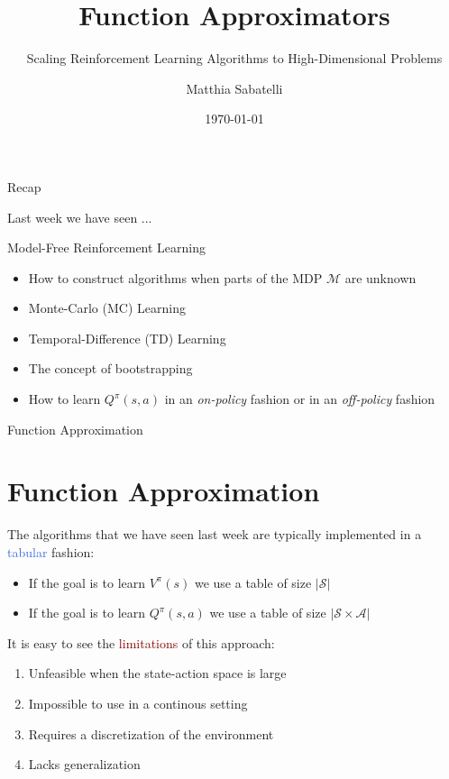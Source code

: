 \documentclass{beamer}
\title{Function Approximators}
\subtitle{Scaling Reinforcement Learning Algorithms to High-Dimensional Problems}
\author{Matthia Sabatelli}
\date{\today}
\begin{document}
\frame{\titlepage} 

\begin{frame}{Recap}

	Last week we have seen ...
	\begin{block}{Model-Free Reinforcement Learning}
		\begin{itemize}
			\item How to construct algorithms when parts of the MDP $\mathcal{M}$ are unknown
			\item Monte-Carlo (MC) Learning
			\item Temporal-Difference (TD) Learning
			\item The concept of bootstrapping
			\item How to learn $Q^{\pi}(s,a)$ in an \textit{on-policy} fashion or in an \textit{off-policy} fashion
		\end{itemize}
	\end{block}

\end{frame}




\begin{frame}{Function Approximation}
	\section{Function Approximation}

	The algorithms that we have seen last week are typically implemented in a \textcolor{RoyalBlue}{tabular} fashion:
	\begin{itemize}
		\item If the goal is to learn $V^{\pi}(s)$ we use a table of size $|\mathcal{S}|$
		\item If the goal is to learn $Q^{\pi}(s,a)$ we use a table of size $|\mathcal{S}\times\mathcal{A}|$
	\end{itemize}

	It is easy to see the \textcolor{Maroon}{limitations} of this approach:

	\begin{enumerate}
		\item Unfeasible when the state-action space is large
		\item Impossible to use in a continous setting
		\item Requires a discretization of the environment
		\item Lacks generalization
	\end{enumerate}

\end{frame}
\end{document}
